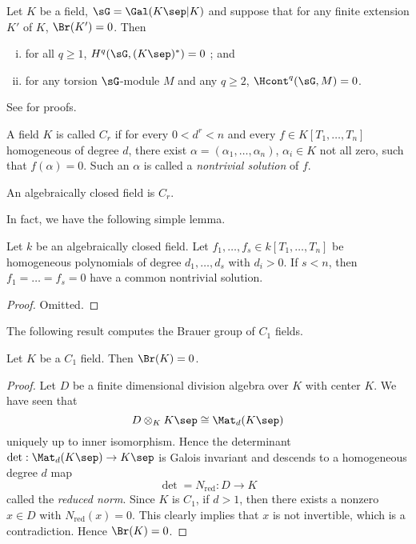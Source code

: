 \begin{prop} \label{prop:SerreGalois}
Let $K$ be a field, $\sG = \Gal(K\sep|K)$ and suppose that for any finite extension $K'$ of $K$, $\Br(K') = 0$. Then
\begin{enumerate}[i.]
\item
for all $ q \geqslant 1$, $H^q (\sG,(K\sep)^*) = 0$ ; and
\item
for any torsion $\sG$-module $M$ and any $q \geqslant 2$, $\Hcont^q (\sG,M) = 0$.
\end{enumerate}
\end{prop}

See \cite{Serre:GaloisCohomology} for proofs.


\begin{defi} 
A field $K$ is called $C_r$ if for every $0 < d^r < n$ and every $f \in K[T_1, \ldots, T_n]$ homogeneous of degree $d$, there exist $\alpha = (\alpha_1, \ldots, \alpha_n)$, $\alpha_i \in K$ not all zero, such that $f(\alpha) = 0$. Such an $\alpha$ is called a \emph{nontrivial solution} of $f$.
\end{defi}

\begin{example} 
An algebraically closed field is $C_r$. 
\end{example}

In fact, we have the following simple lemma.

\begin{lem} 
Let $k$ be an algebraically closed field. Let $f_1, \ldots, f_s \in k[T_1, \ldots, T_n]$ be homogeneous polynomials of degree $d_1, \ldots, d_s$ with $d_i > 0$. If $s < n$, then $f_1 = \ldots = f_s = 0$ have a common nontrivial solution.
\end{lem}

\begin{proof} Omitted. \end{proof}

The following result computes the Brauer group of $C_1$ fields.

\begin{thm} 
Let $K$ be a $C_1$ field. Then $\Br(K) = 0$.
\end{thm}

\begin{proof} 
Let $D$ be a finite dimensional division algebra over $K$ with center $K$. We have seen that
$$
D \otimes_K K\sep \cong \Mat_d(K\sep)
$$
uniquely up to inner isomorphism. Hence the determinant $\det : \Mat_d(K\sep) \to K\sep$ is Galois invariant and descends to a homogeneous degree $d$ map
$$
\det = N_\text{red} : D \longrightarrow K
$$
called the \emph{reduced norm}. Since $K$ is $C_1$, if $d > 1$, then there exists a nonzero $x \in D$ with $N_\text{red}(x) = 0$. This clearly implies that $x$ is not invertible, which is a contradiction. Hence $\Br(K) = 0$.
\end{proof}

